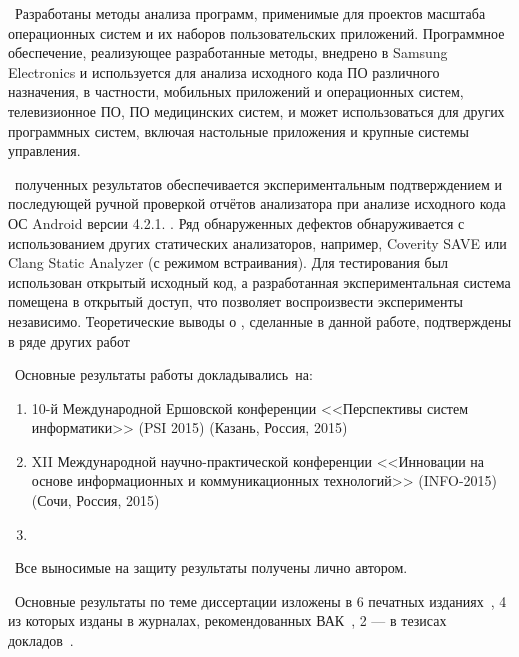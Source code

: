 \influence\ Разработаны методы анализа программ, применимые для проектов масштаба операционных систем и их наборов пользовательских приложений. Программное обеспечение, реализующее разработанные методы, внедрено в Samsung Electronics и используется для анализа исходного кода ПО различного назначения, в частности, мобильных приложений и операционных систем, телевизионное ПО, ПО медицинских систем, и может использоваться для других программных систем, включая настольные приложения и крупные системы управления.

\reliability\ полученных результатов обеспечивается экспериментальным подтверждением и последующей ручной проверкой отчётов анализатора при анализе исходного кода ОС Android версии 4.2.1. . Ряд обнаруженных дефектов обнаруживается с использованием других статических анализаторов, например, Coverity SAVE или Clang Static Analyzer (с режимом встраивания). Для тестирования был использован открытый исходный код, а разработанная экспериментальная система помещена в открытый доступ, что позволяет воспроизвести эксперименты независимо.  Теоретические выводы о , сделанные в данной работе, подтверждены в ряде других работ  

\probation\
Основные результаты работы докладывались~на:
\begin{enumerate}
 \item 10-й Международной Ершовской конференции <<Перспективы систем информатики>> (PSI 2015)  (Казань, Россия, 2015)
 \item XII Международной научно-практической конференции <<Инновации на основе информационных и коммуникационных технологий>> (INFO-2015) (Сочи, Россия, 2015) 
 \item \todo{Открытом семинаре....}
\end{enumerate}


\contribution\ Все выносимые на защиту результаты получены лично автором. 

\publications\ Основные результаты по теме диссертации изложены в 6 печатных изданиях~\cite{summary-impl-mine,summary-intro-mine,summary-inter-unit-mine,summary-checkers-mine,info-2015,psi-2015},
4 из которых изданы в журналах, рекомендованных ВАК~\cite{summary-impl-mine,summary-intro-mine,summary-inter-unit-mine,summary-checkers-mine}, 
2 --- в тезисах докладов~\cite{info-2015,psi-2015}. \todo{Написать о соавторстве}
